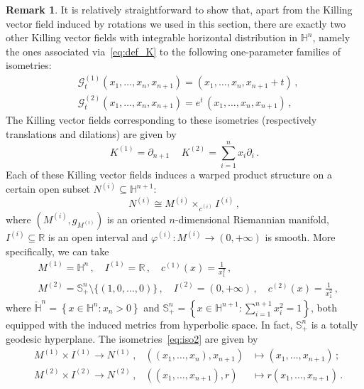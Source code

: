 \documentclass[oneside,12pt]{amsart}
\theoremstyle{definition}
\newtheorem{remark}[lemma]{Remark}
\newcommand{\R}{\mathbb{R}}
\begin{document}
\begin{remark}
It is relatively straightforward to show that, apart from the Killing vector field induced by rotations we used in this section, there are exactly two other Killing vector fields with integrable horizontal distribution in $\mathbb{H}^n$, namely the ones associated via~\eqref{eq:def_K} to the following one-parameter families of isometries:
    \begin{align*}
        &\mathcal{G}^{(1)}_{t} (x_1 , \dots , x_{n} , x_{n+1}) = (x_1 , \dots , x_{n} , x_{n+1} + t) \, , \\
        &\mathcal{G}^{(2)}_{t} (x_1 , \dots , x_{n} , x_{n+1}) = e^t \, (x_1 , \dots , x_{n} , x_{n+1}) \, ,
    \end{align*}
    The Killing vector fields corresponding to these isometries (respectively translations and dilations) are given by
    $$K^{(1)}=\partial_{n+1}  \, \quad K^{(2)} = \sum_{i=1}^{n}x_i \partial_i \, .  $$
    Each of these Killing vector fields induces a warped product structure on a certain open subset $N^{(i)} \subseteq \mathbb{H}^{n+1}$:
    \begin{equation} \label{eq:iso2}
        N^{(i)} \cong M^{(i)} \times_{c^{(i)}} I^{(i)} \, ,
    \end{equation}
    where $\left( M^{(i)} , g_{M^{(i)}} \right)$ is an oriented $n$-dimensional Riemannian manifold, $I^{(i)} \subseteq \R$ is an open interval and $\varphi^{(i)} \colon M^{(i)} \to (0,+\infty)$ is smooth. More specifically, we can take
    \begin{align*}
        &M^{(1)} = \mathbb{H}^{n} \, , \quad I^{(1)} = \R \, , \quad c^{(1)} (x) = \frac{1}{x_1^2} \, , \\
        &M^{(2)} = \mathbb{S}_+^n \setminus \{ (1,0, \dots ,0) \}  \, , \quad I^{(2)} = (0,+\infty)  \, , \quad c^{(2)} (x) = \frac{1}{x_1^2} \, ,
    \end{align*}
    where $\check{\mathbb{H}}^n = \left\{ x \in \mathbb{H}^n \colon x_{n} > 0 \right\}$ and $\mathbb{S}^n_+ = \left\{ x \in \mathbb{H}^{n+1} \colon \sum_{i=1}^{n+1} x_i^2 = 1 \right\}$, both equipped with the induced metrics from hyperbolic space. In fact, $\mathbb{S}^n_+$ is a totally geodesic hyperplane. The isometries~\eqref{eq:iso2} are given by
    \begin{align*}
    &M^{(1)} \times I^{(1)} \to  N^{(1)} \, , &\left( (x_1, \dots, x_n), x_{n+1} \right) &\mapsto (x_1, \dots, x_{n+1}) \, ; \\
    &M^{(2)} \times I^{(2)}  \to N^{(2)} \, , &\left( (x_1, \dots, x_{n+1}), r \right) &\mapsto r (x_1, \dots, x_{n+1}) \, .

\end{align*}
\end{remark}
\end{document}
